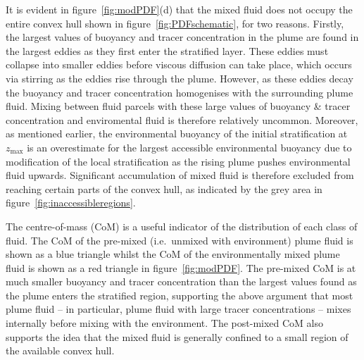 \documentclass[a4paper]{article}
\begin{document}
It is evident in figure~\ref{fig:modPDF}(d) that the mixed fluid does not occupy the entire convex hull 
shown in figure~\ref{fig:PDFschematic}, for two reasons. Firstly, the largest values of buoyancy and
tracer concentration in the plume are found in the largest eddies as they first enter the stratified layer.
These eddies must collapse into smaller eddies before viscous diffusion can take place, which occurs via
stirring as the eddies rise through the plume. However, as these eddies decay the buoyancy and tracer
concentration homogenises with the surrounding plume fluid. Mixing between fluid parcels with these large
values of buoyancy \& tracer concentration and enviromental fluid is therefore relatively uncommon. Moreover,
as mentioned earlier, the environmental buoyancy of the initial stratification at $z_{\max}$ is an
overestimate for the largest accessible environmental buoyancy due to modification of the local
stratification as the rising plume pushes environmental fluid upwards. Significant accumulation of mixed fluid
is therefore excluded from reaching certain parts of the convex hull, as indicated by the grey area in
figure~\ref{fig:inaccessibleregions}. 

The centre-of-mass (CoM) is a useful indicator of the distribution of each class of fluid. The CoM of the
pre-mixed (i.e.\ unmixed with environment) plume fluid is shown as a blue triangle whilst the CoM of the
environmentally mixed plume fluid is shown as a red triangle in figure~\ref{fig:modPDF}. The pre-mixed CoM is
at much smaller buoyancy and tracer concentration than the largest values found as the plume enters the
stratified region, supporting the above argument that most plume fluid -- in particular, plume fluid with
large tracer concentrations -- mixes internally before mixing with the environment. The post-mixed CoM also
supports the idea that the mixed fluid is generally confined to a small region of the available convex hull.
\end{document}
